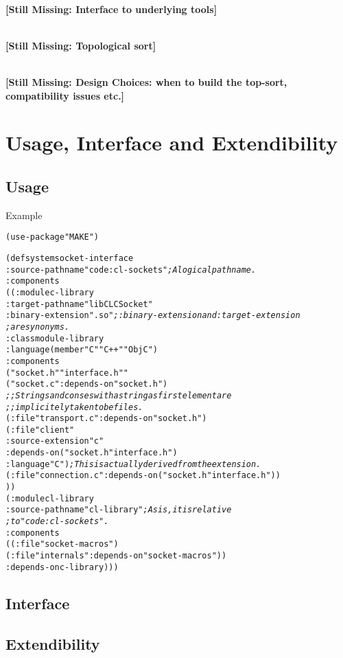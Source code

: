 \documentclass[a4paper]{article}
\newcommand{\missingpart}[1]{{\ }\vspace{2mm}\\
{\textbf{[Still Missing: #1]}}\\
\vspace{2mm}}
\begin{document}
\missingpart{Interface to underlying tools}

\missingpart{Topological sort}

\missingpart{Design Choices: when to build the top-sort, compatibility
issues etc.}

\section{Usage, Interface and Extendibility}

\subsection{Usage}

Example

\begin{alltt}

(use-package "MAKE")

(defsystem socket-interface
   :source-pathname "code:cl-sockets" \emph{; A logical pathname.}
   :components
   ((:module c-library
       :target-pathname "libCLCSocket"
       :binary-extension ".so" \emph{; :binary-extension and :target-extension
                               ; are synonyms.}
       :class module-library
       :language (member "C" "C++" "ObjC")
       :components
       ("socket.h" "interface.h""
        ("socket.c" :depends-on "socket.h")
        \emph{;; Strings and conses with a string as first element are
        ;; implicitelytaken to be files.}
        (:file "transport.c" :depends-on "socket.h")
        (:file "client"
           :source-extension "c"
           :depends-on ("socket.h "interface.h")
           :language "C") \emph{; This is actually derived from the extension.}
        (:file "connection.c" :depends-on ("socket.h "interface.h"))
      ))
    (:module cl-library
       :source-pathname "cl-library" \emph{; As is, it is relative
                                     ; to "code:cl-sockets".}
       :components
       ((:file "socket-macros")
        (:file "internals" :depends-on "socket-macros"))
       :depends-on c-library)))

\end{alltt}

\subsection{Interface}

\subsection{Extendibility}
\end{document}
